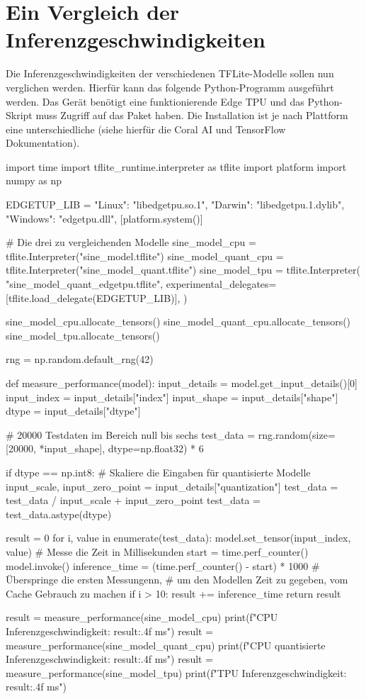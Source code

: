 \section{Ein Vergleich der Inferenzgeschwindigkeiten}
Die Inferenzgeschwindigkeiten der verschiedenen TFLite-Modelle
sollen nun verglichen werden. Hierfür kann das folgende Python-Programm
ausgeführt werden.
Das Gerät benötigt eine funktionierende Edge TPU
und das Python-Skript muss Zugriff auf
das  Paket haben.
Die Installation ist je nach Plattform eine unterschiedliche
(siehe hierfür die Coral AI und TensorFlow Dokumentation).
\begin{pythoncode}
import time
import tflite_runtime.interpreter as tflite
import platform
import numpy as np

EDGETUP_LIB = {
    "Linux": "libedgetpu.so.1",
    "Darwin": "libedgetpu.1.dylib",
    "Windows": "edgetpu.dll",
}[platform.system()]

# Die drei zu vergleichenden Modelle
sine_model_cpu = tflite.Interpreter("sine_model.tflite")
sine_model_quant_cpu = tflite.Interpreter("sine_model_quant.tflite")
sine_model_tpu = tflite.Interpreter(
    "sine_model_quant_edgetpu.tflite",
    experimental_delegates=[tflite.load_delegate(EDGETUP_LIB)],
)

sine_model_cpu.allocate_tensors()
sine_model_quant_cpu.allocate_tensors()
sine_model_tpu.allocate_tensors()

rng = np.random.default_rng(42)

def measure_performance(model):
    input_details = model.get_input_details()[0]
    input_index = input_details["index"]
    input_shape = input_details["shape"]
    dtype = input_details["dtype"]

    # 20000 Testdaten im Bereich null bis sechs
    test_data = rng.random(size=[20000, *input_shape], dtype=np.float32) * 6

    if dtype == np.int8:
        # Skaliere die Eingaben für quantisierte Modelle
        input_scale, input_zero_point = input_details["quantization"]
        test_data = test_data / input_scale + input_zero_point
        test_data = test_data.astype(dtype)

    result = 0
    for i, value in enumerate(test_data):
        model.set_tensor(input_index, value)
        # Messe die Zeit in Millisekunden
        start = time.perf_counter()
        model.invoke()
        inference_time = (time.perf_counter() - start) * 1000
        # Überspringe die ersten Messungenn,
        # um den Modellen Zeit zu gegeben, vom Cache Gebrauch zu machen
        if i > 10:
            result += inference_time
    return result

result = measure_performance(sine_model_cpu)
print(f"CPU Inferenzgeschwindigkeit: {result:.4f} ms")
result = measure_performance(sine_model_quant_cpu)
print(f"CPU quantisierte Inferenzgeschwindigkeit: {result:.4f} ms")
result = measure_performance(sine_model_tpu)
print(f"TPU Inferenzgeschwindigkeit: {result:.4f} ms")
\end{pythoncode}
